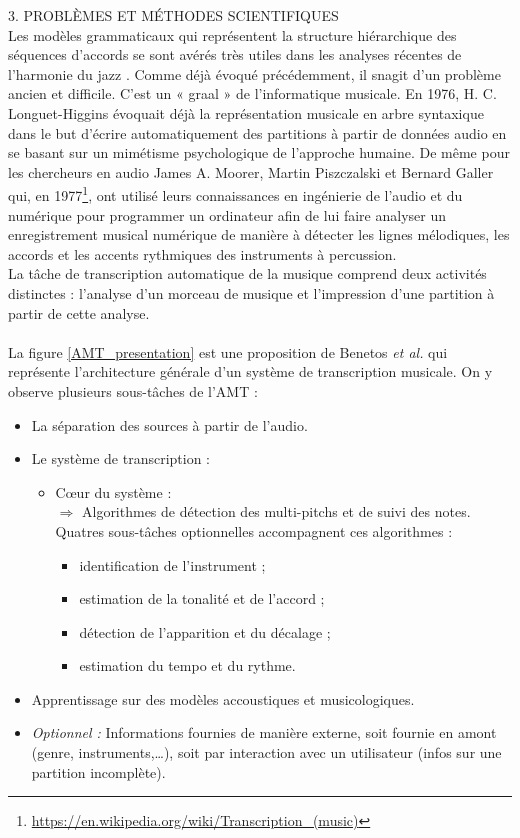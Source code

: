 3. PROBLÈMES ET MÉTHODES SCIENTIFIQUES\\
Les modèles grammaticaux qui représentent la structure hiérarchique des séquences
d’accords se sont avérés très utiles dans les analyses récentes de l’harmonie
du jazz \cite{harasimjazz}.
Comme déjà évoqué précédemment, il snagit d’un problème ancien et difficile.
C’est un « graal » de l’informatique musicale. En 1976, H. C. Longuet-Higgins
\cite{first_one} évoquait déjà la représentation musicale en arbre syntaxique
dans le but d’écrire automatiquement des partitions à partir de données audio
en se basant sur un mimétisme psychologique de l’approche humaine. De même pour
les chercheurs en audio James A. Moorer, Martin Piszczalski et Bernard Galler
qui, en 1977\footnote{\url{https://en.wikipedia.org/wiki/Transcription_(music)}}, 
ont utilisé leurs connaissances en ingénierie de l’audio et du numérique
pour programmer un ordinateur afin de lui faire analyser un enregistrement
musical numérique de manière à détecter les lignes mélodiques, les accords et
les accents rythmiques des instruments à percussion.\\
La tâche de transcription automatique de la musique comprend deux activités
distinctes : l’analyse d’un morceau de musique et l’impression d’une partition
à partir de cette analyse.\\\\
La figure \ref{AMT_presentation} est une proposition de Benetos \textit{et al.}
\cite{future_directions} qui représente l’architecture générale d’un système de
transcription musicale. On y observe plusieurs sous-tâches de l’AMT :
\begin{itemize}
	\item La séparation des sources à partir de l’audio.
	\item Le système de transcription :
	\begin{itemize}
		\item Cœur du système :\\
		$\Rightarrow$ Algorithmes de détection des multi-pitchs et de suivi des \tab notes.\\
		Quatres sous-tâches optionnelles accompagnent ces algorithmes :
		\begin{itemize}
			\item identification de l’instrument ;
			\item estimation de la tonalité et de l’accord ;
			\item détection de l’apparition et du décalage ;
			\item estimation du tempo et du rythme.
		\end{itemize}
	\end{itemize}
	\item Apprentissage sur des modèles accoustiques et musicologiques.
	\item \textit{Optionnel :} Informations fournies de manière externe, soit
        fournie en amont (genre, instruments,…), soit par interaction avec un
        utilisateur (infos sur une partition incomplète).
\end{itemize}
